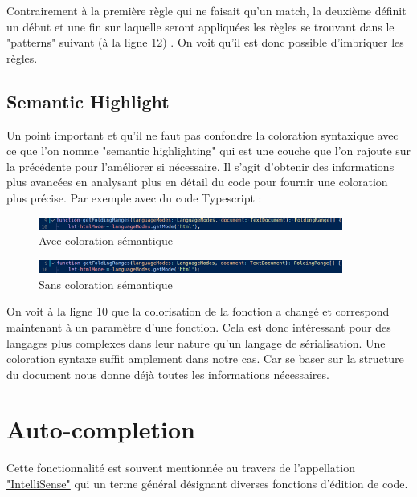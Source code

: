 \documentclass[
    iict, %
    il, %
]{heig-tb}
\begin{document}
Contrairement à la première règle qui ne faisait qu’un match, la deuxième définit un début et une fin sur laquelle seront appliquées les règles se trouvant dans le "patterns" suivant (à la ligne 12) . On voit qu’il est donc possible d’imbriquer les règles.

\subsection{Semantic Highlight}

Un point important et qu’il ne faut pas confondre la coloration syntaxique avec ce que l’on nomme "semantic highlighting" qui est une couche que l’on rajoute sur la précédente pour l’améliorer si nécessaire.
Il s’agit d’obtenir des informations plus avancées en analysant plus en détail du code pour fournir une coloration plus précise.
Par exemple avec du code Typescript :

\begin{figure}[!ht]
    \begin{center}
        \includegraphics[width=10cm]{assets/figures/semantic-coloration-with.png}
    \end{center}
    \caption[Avec coloration sémantique ]{\label{semantic-coloration-with} Avec coloration sémantique }
\end{figure}

\begin{figure}[!ht]
    \begin{center}
        \includegraphics[width=10cm]{assets/figures/semantic-coloration-without.png}
    \end{center}
    \caption[Sans coloration sémantique]{\label{semantic-coloration-without} Sans coloration sémantique}
\end{figure}

On voit à la ligne 10 que la colorisation de la fonction a changé et correspond maintenant à un paramètre d’une fonction.
Cela est donc intéressant pour des langages plus complexes dans leur nature qu’un langage de sérialisation. Une coloration syntaxe suffit amplement dans notre cas. Car se baser sur la structure du document nous donne déjà toutes les informations nécessaires.

\section{Auto-completion}
Cette fonctionnalité est souvent mentionnée au travers de l’appellation \href{https://code.visualstudio.com/docs/editor/intellisense}{"IntelliSense"} qui un terme général désignant diverses fonctions d'édition de code.
\end{document}
